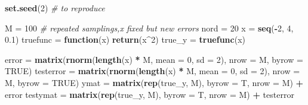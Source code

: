 \documentclass[]{article}
\newenvironment{Shaded}{\begin{snugshade}}{\end{snugshade}}
\newcommand{\KeywordTok}[1]{\textcolor[rgb]{0.13,0.29,0.53}{\textbf{#1}}}
\newcommand{\DataTypeTok}[1]{\textcolor[rgb]{0.13,0.29,0.53}{#1}}
\newcommand{\DecValTok}[1]{\textcolor[rgb]{0.00,0.00,0.81}{#1}}
\newcommand{\FloatTok}[1]{\textcolor[rgb]{0.00,0.00,0.81}{#1}}
\newcommand{\StringTok}[1]{\textcolor[rgb]{0.31,0.60,0.02}{#1}}
\newcommand{\CommentTok}[1]{\textcolor[rgb]{0.56,0.35,0.01}{\textit{#1}}}
\newcommand{\OtherTok}[1]{\textcolor[rgb]{0.56,0.35,0.01}{#1}}
\newcommand{\ControlFlowTok}[1]{\textcolor[rgb]{0.13,0.29,0.53}{\textbf{#1}}}
\newcommand{\OperatorTok}[1]{\textcolor[rgb]{0.81,0.36,0.00}{\textbf{#1}}}
\newcommand{\NormalTok}[1]{#1}
\begin{document}
\begin{Shaded}
\begin{Highlighting}[]
\KeywordTok{set.seed}\NormalTok{(}\DecValTok{2}\NormalTok{)  }\CommentTok{# to reproduce}

\NormalTok{M =}\StringTok{ }\DecValTok{100}  \CommentTok{# repeated samplings,x fixed but new errors}
\NormalTok{nord =}\StringTok{ }\DecValTok{20}
\NormalTok{x =}\StringTok{ }\KeywordTok{seq}\NormalTok{(}\OperatorTok{-}\DecValTok{2}\NormalTok{, }\DecValTok{4}\NormalTok{, }\FloatTok{0.1}\NormalTok{)}
\NormalTok{truefunc =}\StringTok{ }\ControlFlowTok{function}\NormalTok{(x) }\KeywordTok{return}\NormalTok{(x}\OperatorTok{^}\DecValTok{2}\NormalTok{)}
\NormalTok{true_y =}\StringTok{ }\KeywordTok{truefunc}\NormalTok{(x)}

\NormalTok{error =}\StringTok{ }\KeywordTok{matrix}\NormalTok{(}\KeywordTok{rnorm}\NormalTok{(}\KeywordTok{length}\NormalTok{(x) }\OperatorTok{*}\StringTok{ }\NormalTok{M, }\DataTypeTok{mean =} \DecValTok{0}\NormalTok{, }\DataTypeTok{sd =} \DecValTok{2}\NormalTok{), }\DataTypeTok{nrow =}\NormalTok{ M, }\DataTypeTok{byrow =} \OtherTok{TRUE}\NormalTok{)}
\NormalTok{testerror =}\StringTok{ }\KeywordTok{matrix}\NormalTok{(}\KeywordTok{rnorm}\NormalTok{(}\KeywordTok{length}\NormalTok{(x) }\OperatorTok{*}\StringTok{ }\NormalTok{M, }\DataTypeTok{mean =} \DecValTok{0}\NormalTok{, }\DataTypeTok{sd =} \DecValTok{2}\NormalTok{), }\DataTypeTok{nrow =}\NormalTok{ M, }
    \DataTypeTok{byrow =} \OtherTok{TRUE}\NormalTok{)}
\NormalTok{ymat =}\StringTok{ }\KeywordTok{matrix}\NormalTok{(}\KeywordTok{rep}\NormalTok{(true_y, M), }\DataTypeTok{byrow =}\NormalTok{ T, }\DataTypeTok{nrow =}\NormalTok{ M) }\OperatorTok{+}\StringTok{ }\NormalTok{error}
\NormalTok{testymat =}\StringTok{ }\KeywordTok{matrix}\NormalTok{(}\KeywordTok{rep}\NormalTok{(true_y, M), }\DataTypeTok{byrow =}\NormalTok{ T, }\DataTypeTok{nrow =}\NormalTok{ M) }\OperatorTok{+}\StringTok{ }\NormalTok{testerror}


\end{Highlighting}
\end{Shaded}
\end{document}
